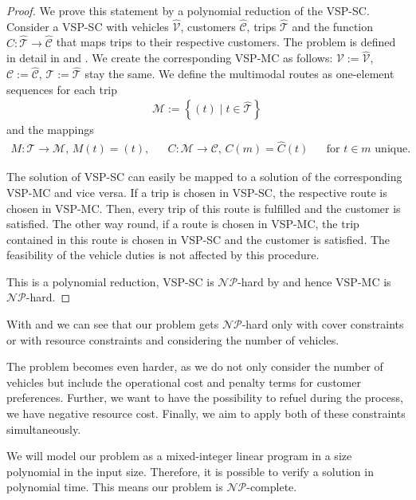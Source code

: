 \begin{proof}

We prove this statement by a polynomial reduction of the VSP-SC. Consider a VSP-SC with vehicles $\hat{\mathcal{V}}$, customers $\hat{\mathcal{C}}$, trips $\hat{\mathcal{T}}$ and the function $\hat{C}:\hat{\mathcal{T}}\to\hat{\mathcal{C}}$ that maps trips to their respective customers. The problem is defined in detail in \cite{Kaiser} and \cite{Knoll}. We create the corresponding VSP-MC as follows: $\mathcal{V}:=\hat{\mathcal{V}}$, $\mathcal{C}:=\hat{\mathcal{C}}$, $\mathcal{T}:=\hat{\mathcal{T}}$ stay the same. We define the multimodal routes as one-element sequences for each trip
\begin{align*}
	\mathcal{M}:=\left\{(t)\mid t\in\hat{\mathcal{T}}\right\}
\end{align*}
and the mappings
\begin{align*}
	M:\mathcal{T}\to\mathcal{M} \text{, } M(t) = (t), && C:\mathcal{M}\to\mathcal{C} \text{, } C(m) = \hat{C}(t) && \text{for } t\in m \text{ unique.}
\end{align*}

The solution of VSP-SC can easily be mapped to a solution of the corresponding VSP-MC and vice versa. If a trip is chosen in VSP-SC, the respective route is chosen in VSP-MC. Then, every trip of this route is fulfilled and the customer is satisfied. The other way round, if a route is chosen in VSP-MC, the trip contained in this route is chosen in VSP-SC and the customer is satisfied. The feasibility of the vehicle duties is not affected by this procedure.

This is a polynomial reduction, VSP-SC is $\mathcal{NP}$-hard by  and hence VSP-MC is $\mathcal{NP}$-hard.
%
\end{proof}

With  and  we can see that our problem gets $\mathcal{NP}$-hard only with cover constraints or with resource constraints and considering the number of vehicles.

The problem becomes even harder, as we do not only consider the number of vehicles but include the operational cost and penalty terms for customer preferences. Further, we want to have the possibility to refuel during the process, \ie we have negative resource cost. Finally, we aim to apply both of these constraints simultaneously. 

We will model our problem as a mixed-integer linear program in a size polynomial in the input size. Therefore, it is possible to verify a solution in polynomial time. This means our problem is $\mathcal{NP}$-complete.

